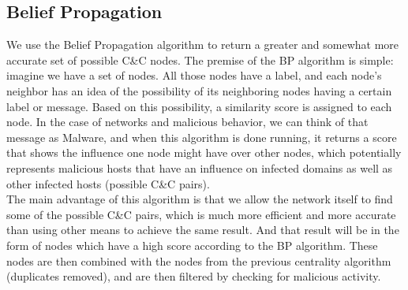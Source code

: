 \documentclass{article} %
\begin{document}
\subsection{Belief Propagation}
We use the Belief Propagation algorithm to return a greater and somewhat more accurate set of possible C\&C nodes.
The premise of the BP algorithm is simple: imagine we have a set of nodes. All those nodes have a label, and each node's neighbor has an idea of the possibility of its neighboring nodes having a certain label or message. Based on this 
possibility, a similarity score is assigned to each node. In the case of networks and malicious behavior, we can think of that message as Malware, and when this algorithm is done running, it returns a score that shows the influence one 
node might have over other nodes, which potentially represents malicious hosts that have an influence on infected domains as well as other infected hosts (possible C\&C pairs). \\
The main advantage of this algorithm is that we allow the network itself to find some of the possible C\&C pairs, which is much more efficient and more accurate than using other means to achieve the same result. And that result will be in
the form of nodes which have a high score according to the BP algorithm. These nodes are then combined with the nodes from the previous centrality algorithm (duplicates removed), and are then filtered by checking for malicious activity.
\end{document}
